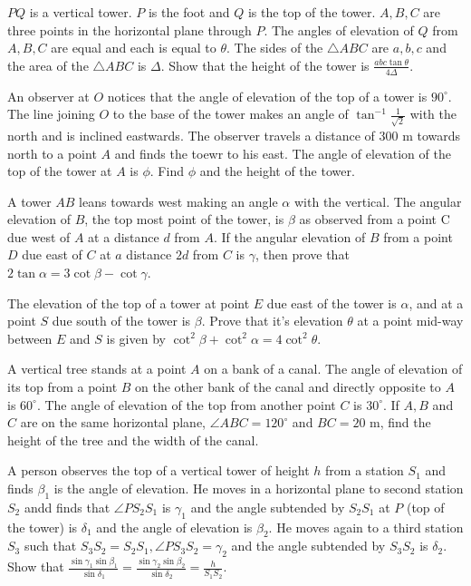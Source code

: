 \item $PQ$ is a vertical tower. $P$ is the foot and $Q$ is the top of the tower. $A, B, C$ are three points
  in the horizontal plane through $P$. The angles of elevation of $Q$ from $A, B, C$ are equal and each is
  equal to $\theta$. The sides of the $\triangle ABC$ are $a, b, c$ and the area of the $\triangle ABC$
  is $\Delta$. Show that the height of the tower is $\frac{abc\tan\theta}{4\Delta}$.

\item An observer at $O$ notices that the angle of elevation of the top of a tower is $90^\circ$. The line joining
  $O$ to the base of the tower makes an angle of $\tan^{-1}\frac{1}{\sqrt{2}}$ with the north and is inclined
  eastwards. The observer travels a distance of $300$ m towards north to a point $A$ and finds the toewr to his
  east. The angle of elevation of the top of the tower at $A$ is $\phi$. Find $\phi$ and the height of the
  tower.

\item A tower $AB$ leans towards west making an angle $\alpha$ with the vertical. The angular elevation of $B$,
  the top most point of the tower, is $\beta$ as observed from a point C due west of $A$ at a distance $d$
  from $A$. If the angular elevation of $B$ from a point $D$ due east of $C$ at $a$ distance
  $2d$ from $C$ is $\gamma$, then prove that $2\tan\alpha = 3\cot\beta - \cot\gamma$.

\item The elevation of the top of a tower at point $E$ due east of the tower is $\alpha$, and at a point $S$ due
  south of the tower is $\beta$. Prove that it's elevation $\theta$ at a point mid-way between $E$ and
  $S$ is given by $\cot^2\beta + \cot^2\alpha = 4\cot^2\theta$.

\item A vertical tree stands at a point $A$ on a bank of a canal. The angle of elevation of its top from a point $B$ on
  the other bank of the canal and directly opposite to $A$ is $60^\circ$. The angle of elevation of the top from
  another point $C$ is $30^\circ$. If $A, B$ and $C$ are on the same horizontal plane, $\angle ABC
  = 120^\circ$ and $BC = 20$ m, find the height of the tree and the width of the canal.

\item A person observes the top of a vertical tower of height $h$ from a station $S_1$ and finds $\beta_1$ is the
  angle of elevation. He moves in a horizontal plane to second station $S_2$ andd finds that $\angle PS_2S_1$ is
  $\gamma_1$ and the angle subtended by $S_2S_1$ at $P$ (top of the tower) is $\delta_1$ and the angle
  of elevation is $\beta_2$. He moves again to a third station $S_3$ such that $S_3S_2 = S_2S_1, \angle
  PS_3S_2 = \gamma_2$ and the angle subtended by $S_3S_2$ is $\delta_2$. Show that
  $\frac{\sin\gamma_1\sin\beta_1}{\sin\delta_1} = \frac{\sin\gamma_2\sin\beta_2}{\sin\delta_2} = \frac{h}{S_1S_2}$.

